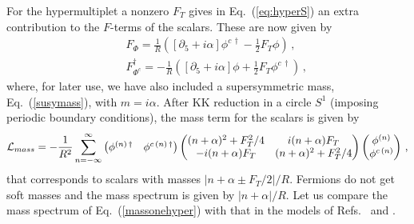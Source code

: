 \documentclass[a4paper,12pt]{article}
\newcommand{\Ft}{F_{T}}
\begin{document}
For the hypermultiplet 
a nonzero $F_T$ gives in Eq.~(\ref{eq:hyperS}) 
an extra
contribution to the $F$-terms of the scalars.
These are now given  by 
\begin{eqnarray}
       && F_{\Phi}= \frac{1}{R}\left([\partial_{5}+i\alpha]\phi^{c\,\dagger} -
            \frac{1}{2}\Ft \phi\right)\, ,\nonumber\\
 && F_{\Phi^{c}}^\dagger =-\frac{1}{R}\left([\partial_{5}+i\alpha]{\phi}+
    \frac{1}{2}\Ft \phi^{c\, \dagger}\right)\, ,
\label{eq:relFb}
\end{eqnarray}
where, for later use,  we have also included a supersymmetric mass,
Eq.~(\ref{susymass}), with $m=i\alpha$.
After KK reduction in a circle $S^1$ (imposing periodic boundary 
conditions), 
the mass term  for 
the scalars is given by 
\begin{equation}   
{\cal L}_{mass}=-\frac{1}{R^2}\sum^{\infty}_{n=-\infty}
\begin{pmatrix}
       \phi^{(n)\, \dagger}&\phi^{c\, (n)\, \dagger}
    \end{pmatrix}
\begin{pmatrix}
       (n+ \alpha)^2+ F^2_T/4
 &        i(n+\alpha)F_T  \\
        -i(n+\alpha)F_T 
 &       (n+ \alpha)^2+ F^2_T/4
    \end{pmatrix}
\begin{pmatrix}
       \phi^{(n)} \\
         \phi^{c\, (n)}
    \end{pmatrix}\, ,
\label{massonehyper}
\end{equation}
that  corresponds to scalars with  masses $|n+\alpha\pm F_T/2|/R$.
Fermions do not get soft masses 
and the  mass spectrum  is given by $|n+\alpha|/R$.
Let us compare the mass spectrum of Eq.~(\ref{massonehyper})
with that
in the models of Refs.~\cite{pq} and \cite{bhn}.
\end{document}
